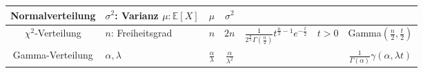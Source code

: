 \begin{fontsize}{10}{13}
{\begin{tabular}{||c|p{2cm}|*{4}{c|}|}
			Normalverteilung                                                                               & $\sigma^2$: Varianz \newline $\mu: \mathbb{E}[X]$                                  & $\mu$                      & $\sigma^2$                                                                           &
			\raisebox{-5pt}{$\frac {1}{\sqrt {2\pi \sigma^{2}}}e^{-{\frac {(t-\mu )^{2}}{2\sigma ^{2}}}}
			-\infty <t<\infty $}                                                                           & \raisebox{-5pt}{${\frac {1}{\sigma {\sqrt {2\pi }}}}\int _{-\infty }^{t}e^{-{\frac
			{1}{2}}\left({\frac {y-\mu }{\sigma }}\right)^{2}}\mathrm {d} y$}                                                                                                                                                                                                                                                             \\
			\hline

			$\chi^2$-Verteilung                                                                            & $n$: Freiheitsgrad                                                                 & $n$                        & $2n$                                                                                 & $\frac
				{1}{2^{\frac {n}{2}}\Gamma ({\tfrac {n}{2}})}t^{{\frac {n}{2}}-1}e^
			{-{\frac {t}{2}}}\quad t>0$                                                                    & Gamma$(\frac{n}{2}, \frac{t}{2})$                                                                                                                                                                                            \\[8pt]
			\hline

			Gamma-Verteilung                                                                               & $\alpha,\lambda$                                                                   & $\frac{\alpha}{\lambda}$   & $\frac{\alpha}{\lambda^2}$                                                           &
			\raisebox{-5pt}{${\begin{aligned}{\frac {\lambda ^{\alpha }t^{\alpha -1}e^{-\lambda t}}{\Gamma
								                  (\alpha )}}\quad t>0\quad \alpha ,\lambda >0\end{aligned}}$} & ${\frac
			{1}{\Gamma (\alpha )}}\gamma (\alpha ,\lambda t)$                                                                                                                                                                                                                                                                             \\[10pt]
			\hline


\end{tabular}}
\end{fontsize}
